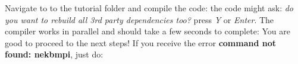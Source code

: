 {}
\markdownRendererSectionEnd 
\markdownRendererSectionEnd \markdownRendererSectionBegin
{}\markdownRendererInterblockSeparator
{}Navigate to to the tutorial folder and compile the code:\markdownRendererInterblockSeparator
{}\markdownRendererInterblockSeparator
{}the code might ask: \textit{do you want to rebuild all 3rd party dependencies too?} press \textit{Y} or \textit{Enter}. The compiler works in parallel and should take a few seconds to complete:\markdownRendererInterblockSeparator
{}\markdownRendererInterblockSeparator
{}You are good to proceed to the next steps!\markdownRendererInterblockSeparator
{}\markdownRendererSectionBegin
{}\markdownRendererInterblockSeparator
{}If you receive the error \textbf{command not found: nekbmpi}, just do:\markdownRendererInterblockSeparator
{}
\markdownRendererSectionEnd 
\markdownRendererSectionEnd \markdownRendererDocumentEnd
